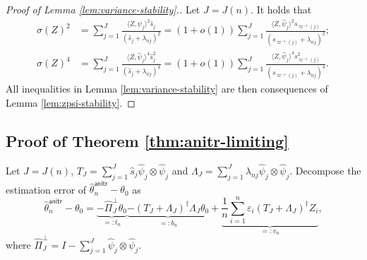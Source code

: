 \documentclass[11pt,a4paper]{article}
\renewcommand{\hat}{\widehat}
\theoremstyle{definition}
\theoremstyle{plain}
\theoremstyle{remark}
\newcommand{\supp}{\mathrm{supp}}
\newcommand{\anitr}{\mathsf{anitr}}
\begin{document}
\begin{proof}[Proof of Lemma \ref{lem:variance-stability}.]
Let $J=J(n)$.
It holds that
\begin{align*}
\sigma(Z)^2 &= \sum_{j=1}^J \frac{\langle Z,\hat\psi_j\rangle^2\hat s_j}{(\hat s_j+\lambda_{nj})^2} = (1+o(1))\sum_{j=1}^J\frac{\langle Z,\hat\psi_j\rangle^2 s_{\varpi^{-1}(j)}}{(s_{\varpi^{-1}(j)}+\lambda_{nj})^2};\\
\sigma(Z)^4 &= \sum_{j=1}^J\frac{\langle Z,\hat\psi_j\rangle^4\hat s_j^2}{(\hat s_j+\lambda_{nj})^4} = (1+o(1))\sum_{j=1}^J\frac{\langle Z,\hat\psi_j\rangle^4 s_{\varpi^{-1}(j)}^2}{(s_{\varpi^{-1}(j)}+\lambda_{nj})^4}.
\end{align*}
All inequalities in Lemma \ref{lem:variance-stability} are then consequences of Lemma \ref{lem:zpsi-stability}.
%
\end{proof}

\subsection{Proof of Theorem \ref{thm:anitr-limiting}}

Let $J=J(n)$, $T_J=\sum_{j=1}^J \hat s_j\hat\psi_j\otimes \hat\psi_j$ and $\Lambda_J=\sum_{j=1}^J\lambda_{nj}\hat\psi_j\otimes\hat\psi_j$.
Decompose the estimation error of $\hat\theta_n^\anitr-\theta_0$ as
\begin{equation}
\hat\theta_n^\anitr-\theta_0 = \underbrace{-\hat\Pi_J^\perp\theta_0}_{=:t_n} \underbrace{-(T_J+\Lambda_J)^\dagger \Lambda_J\theta_0}_{=: b_n} + \underbrace{\frac{1}{n}\sum_{i=1}^n\varepsilon_i (T_J+\Lambda_J)^\dagger Z_i}_{=:v_n},
\label{eq:anitr-decomp}
\end{equation}
where $\hat\Pi_J^\perp = I - \sum_{j=1}^J\hat\psi_j\otimes\hat\psi_j$.
\end{document}
